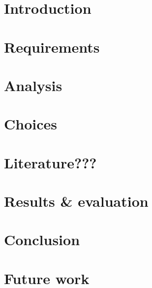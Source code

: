 \documentclass[a4paper,10pt]{article}
\begin{document}

\tableofcontents


\section{Introduction}
\label{sec:introduction}


\section{Requirements}
\label{sec:description}


\section{Analysis}
\label{sec:analysis}


\section{Choices}
\label{sec:choices}


\section{Literature???}
\label{sec:literature}


%

\section{Results \& evaluation}
\label{sec:results}


\section{Conclusion}
\label{sec:conclusion}


\section{Future work}
\label{sec:future-work}

\end{document}
